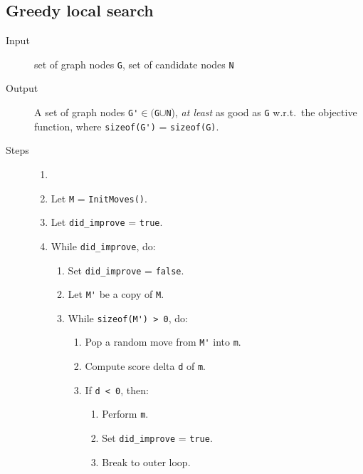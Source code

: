 \documentclass[14pt]{article}
\begin{document}
\subsection{Greedy local search}
\begin{description}
	\item [Input] set of graph nodes \verb`G`, set of candidate nodes \verb`N`
	\item [Output] A set of graph nodes \verb`G'`$ ∈ ($\verb`G`$∪$\verb`N`), \emph{at least} as good as
		\verb`G` w.r.t.\ the objective function, where \verb`sizeof(G')` = \verb`sizeof(G)`.
	\item [Steps]
		\begin{enumerate}\item []
			\item Let \verb`M` = \verb`InitMoves()`.
			\item Let \verb`did_improve` = \verb`true`.
			\item While \verb`did_improve`, do:
				\begin{enumerate}
					\item Set \verb`did_improve` = \verb`false`.
					\item Let \verb`M'` be a copy of \verb`M`.
					\item While \verb`sizeof(M') > 0`, do:
						\begin{enumerate}
							\item Pop a random move from \verb`M'` into \verb`m`.
							\item Compute score delta \verb`d` of \verb`m`.
							\item If \verb`d < 0`, then:
								\begin{enumerate}
									\item Perform \verb`m`.
									\item Set \verb`did_improve` = \verb`true`.
									\item Break to outer loop.
								\end{enumerate}
						\end{enumerate}
				\end{enumerate}
		\end{enumerate}
\end{description}
\end{document}

